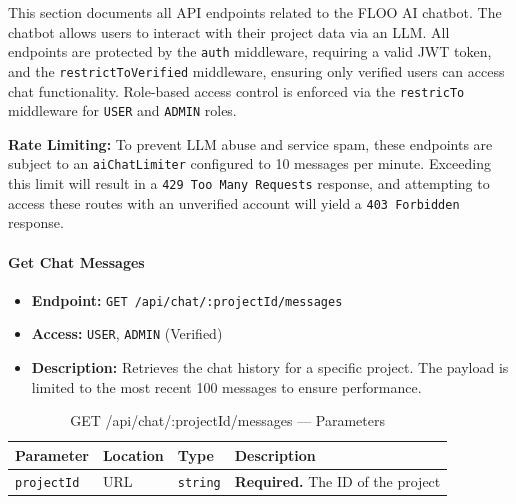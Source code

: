 This section documents all API endpoints related to the FLOO AI chatbot. The chatbot allows users to interact with their project data via an LLM. All endpoints are protected by the \texttt{auth} middleware, requiring a valid JWT token, and the \texttt{restrictToVerified} middleware, ensuring only verified users can access chat functionality. Role-based access control is enforced via the \texttt{restricTo} middleware for \texttt{USER} and \texttt{ADMIN} roles.

\textbf{Rate Limiting:} To prevent LLM abuse and service spam, these endpoints are subject to an \texttt{aiChatLimiter} configured to 10 messages per minute. Exceeding this limit will result in a \texttt{429 Too Many Requests} response, and attempting to access these routes with an unverified account will yield a \texttt{403 Forbidden} response.

\paragraph{Get Chat Messages}
\label{subsubsec:get-chat-messages}

\begin{itemize}
  \item \textbf{Endpoint:} \texttt{GET /api/chat/:projectId/messages}
  \item \textbf{Access:} \texttt{USER}, \texttt{ADMIN} (Verified)
  \item \textbf{Description:} Retrieves the chat history for a specific project. The payload is limited to the most recent 100 messages to ensure performance.
\end{itemize}

\begin{table}[H]
\centering
\renewcommand{\arraystretch}{1.3}
\begin{tabularx}{\textwidth}{|l|l|l|X|}
\hline
\textbf{Parameter} & \textbf{Location} & \textbf{Type} & \textbf{Description} \\
\hline
\texttt{projectId} & URL & \texttt{string} & \textbf{Required.} The ID of the project \\
\hline
\end{tabularx}
\caption{GET /api/chat/:projectId/messages — Parameters}
\label{tab:get-chat-messages-params}
\end{table}

